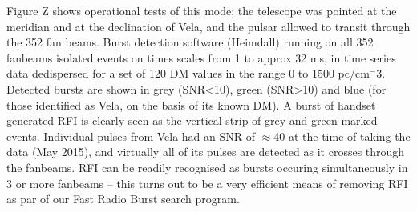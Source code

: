 Figure Z shows operational tests of this mode; the telescope was pointed at the meridian and at the declination of Vela, and the pulsar allowed to transit through the 352 fan beams. Burst detection software (Heimdall) running on all 352 fanbeams isolated events on times scales from 1 to approx 32 ms, in time series data dedispersed for a set of 120 DM values in the range 0 to 1500 pc/cm$^-3$. Detected bursts are shown in grey (SNR<10), green (SNR>10) and blue (for those identified as Vela, on the basis of its known DM). A burst of handset generated RFI is clearly seen as the vertical strip of grey and green marked events. Individual pulses from Vela had an SNR of $\approx 40$ at the time of taking the data (May 2015), and virtually all of its pulses are detected as it crosses through the fanbeams. RFI can be readily recognised as bursts occuring simultaneously in 3 or more fanbeams -- this turns out to be a very efficient means of removing RFI as par of our Fast Radio Burst search program.    

  